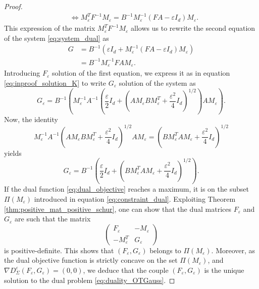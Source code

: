 \documentclass[]{article}
\numberwithin{equation}{section}
\theoremstyle{plain}
\begin{document}
{\begin{proof}
\begin{align*}
		& \Leftrightarrow   M_\varepsilon^TF^{-1}M_{\varepsilon}= B^{-1}M_\varepsilon^{-1}(FA - \varepsilon I_d)M_{\varepsilon}.
	\end{align*}
	This expression of the matrix $M_{\varepsilon}^TF^{-1}M_{\varepsilon}$ allows us to rewrite the second equation of the system \eqref{eq:system_dual} as
	\begin{align*}
		G &= B^{-1}( \varepsilon I_d + M_{\varepsilon}^{-1}(FA - \varepsilon I_d)M_{\varepsilon})\\
		& = B^{-1}M_{\varepsilon}^{-1}FAM_{\varepsilon}.
	\end{align*}
	Introducing $F_{\varepsilon}$ solution of the first equation, we express it as in equation \eqref{eq:inproof_solution_K} to write $G_{\varepsilon}$ solution of the system as 
	\begin{equation}
		G_\varepsilon  = B^{-1} \left( M_{\varepsilon}^{-1}A^{-1}\left( \frac{\varepsilon}{2}I_d + \left(AM_{\varepsilon}BM_{\varepsilon}^T+ \frac{\varepsilon^2}{4}I_d  \right)^{1/2} \right)AM_{\varepsilon}\right).
	\end{equation}
	Now, the identity
	\begin{equation*}
		M_\varepsilon^{-1}A^{-1}\left(AM_{\varepsilon}BM_{\varepsilon}^T+ \frac{\varepsilon^2}{4}I_d  \right)^{1/2} AM_{\varepsilon}=\left(BM_{\varepsilon}^TAM_{\varepsilon}+ \frac{\varepsilon^2}{4}I_d  \right)^{1/2}
	\end{equation*}
	yields 
	\begin{equation}
		G_{\varepsilon} = B^{-1}\left( \frac{\varepsilon}{2}I_d +\left(BM_{\varepsilon}^TAM_{\varepsilon}+ \frac{\varepsilon^2}{4}I_d  \right)^{1/2} \right).
	\end{equation}
	If the dual function \eqref{eq:dual_objective} reaches a maximum, it is on the subset $\Pi(M_\varepsilon)$ introduced in equation \eqref{eq:constraint_dual}. Exploiting Theorem \ref{thm:positive_mat_positive_schur}, one can show that the dual matrices $F_\varepsilon$ and $G_\varepsilon$ are such that the matrix 
	\begin{equation}
		\begin{pmatrix}
			F_\varepsilon & -M_\varepsilon \\
			-M_\varepsilon^T & G_\varepsilon
		\end{pmatrix}
	\end{equation}
	is positive-definite. This shows that $(F_\varepsilon, G_\varepsilon)$ belongs to $\Pi(M_\varepsilon)$. Moreover, as the dual objective function is strictly concave on the set $\Pi(M_\varepsilon)$, and $\nabla D_{\Sigma}^\varepsilon(F_\varepsilon, G_\varepsilon) = (0,0)$, we deduce that the couple $(F_\varepsilon, G_\varepsilon)$ is the unique solution to the dual problem \eqref{eq:duality_OTGauss}.
\end{proof} 


}
\end{document}
